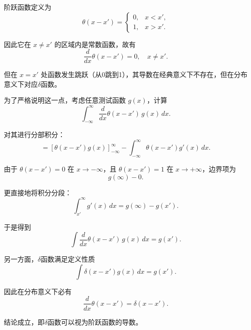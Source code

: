 \begin{solution}

\answer
阶跃函数定义为
\[
\theta(x-x')=
\begin{cases}
0, & x<x',\\
1, & x>x'.
\end{cases}
\]

因此它在 $x\neq x'$ 的区域内是常数函数，故有
\[
\frac{d}{dx}\theta(x-x')=0,\quad x\neq x'.
\]

但在 $x=x'$ 处函数发生跳跃（从0跳到1），其导数在经典意义下不存在，但在分布意义下对应$ \delta $函数。

为了严格说明这一点，考虑任意测试函数 $g(x)$，计算
\[
\int_{-\infty}^{\infty}\frac{d}{dx}\theta(x-x')\,g(x)\,dx.
\]

对其进行分部积分：
\[
=\left[\theta(x-x')g(x)\right]_{-\infty}^{\infty}-\int_{-\infty}^{\infty}\theta(x-x')g'(x)\,dx.
\]

由于 $\theta(x-x')=0$ 在 $x\to -\infty$，且 $\theta(x-x')=1$ 在 $x\to +\infty$，边界项为
\[
g(\infty)-0.
\]

更直接地将积分分段：
\[
\int_{x'}^{\infty} g'(x)\,dx = g(\infty)-g(x').
\]

于是得到
\[
\int \frac{d}{dx}\theta(x-x')\,g(x)\,dx = g(x').
\]

另一方面，$ \delta $函数满足定义性质
\[
\int \delta(x-x')g(x)\,dx=g(x').
\]

因此在分布意义下必有
\[
\frac{d}{dx}\theta(x-x')=\delta(x-x').
\]

结论成立，即$ \delta $函数可以视为阶跃函数的导数。
\end{solution}


